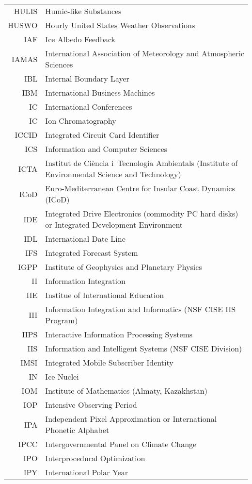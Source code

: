 \documentclass[12pt,twoside]{article}
\begin{document}
\begin{longtable}[>{\bfseries}l]{>{\ttfamily}r l}
HULIS & Humic-like Substances \\
HUSWO & Hourly United States Weather Observations \\
IAF & Ice Albedo Feedback \\
IAMAS & International Association of Meteorology and Atmospheric Sciences \\
IBL & Internal Boundary Layer \\
IBM & International Business Machines \\
IC & International Conferences \\
IC & Ion Chromatography \\
ICCID & Integrated Circuit Card Identifier \\
ICS & Information and Computer Sciences \\
ICTA & Institut de Ci\`{e}ncia i~Tecnologia Ambientals (Institute of Environmental Science and Technology) \\
ICoD & Euro-Mediterranean Centre for Insular Coast Dynamics (ICoD) \\
IDE & Integrated Drive Electronics (commodity PC hard disks) or Integrated Development Environment \\
IDL & International Date Line \\
IFS & Integrated Forecast System \\
IGPP & Institute of Geophysics and Planetary Physics \\
II & Information Integration \\
IIE & Institue of International Education \\
III & Information Integration and Informatics (NSF CISE IIS Program) \\
IIPS & Interactive Information Processing Systems \\
IIS & Information and Intelligent Systems (NSF CISE Division) \\
IMSI & Integrated Mobile Subscriber Identity \\
IN & Ice Nuclei \\
IOM & Institute of Mathematics (Almaty, Kazakhstan) \\
IOP & Intensive Observing Period \\
IPA & Independent Pixel Approximation or International Phonetic Alphabet \\
IPCC & Intergovernmental Panel on Climate Change \\
IPO & Interprocedural Optimization \\
IPY & International Polar Year \\

\end{longtable}
\end{document}
